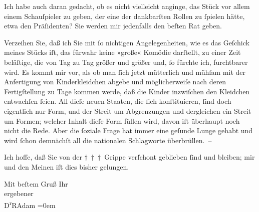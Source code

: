 \pstart
           Ich habe auch daran gedacht, ob es nicht vielleicht anginge, das {\pb}Stück vor allem einem Schauſpieler zu
               geben, der eine der dankbarſten Rollen zu{ }ſpielen hätte, etwa den Präſidenten? Sie werden mir jedenfalls den
               beſten Rat geben.\pend
           
\pstart
           Verzeihen Sie, daß ich Sie mit{ }ſo nichtigen Angelegenheiten, wie es das Geſchick
               meines Stücks iſt, das fürwahr
               keine »große« Komödie darſtellt, zu einer Zeit beläſtige, die von Tag zu Tag größer
               und größer und,{ }ſo fürchte ich, furchtbarer wird. Es kommt mir vor, als ob man{ }ſich
               jetzt mütterlich und mühſam mit der Anfertigung von Kinderkleidchen abgebe und
               möglicherweiſe nach deren Fertigſtellung zu Tage kommen werde, daß die Kinder
               inzwiſchen  den Kleidchen
               entwachſen{ }ſeien. All dieſe neuen Staaten, die{ }ſich konſtituieren,{ }ſind doch
               eigentlich nur Form, und der Streit um Abgrenzungen und dergleichen ein Streit um
               Formen; welcher Inhalt dieſe Form füllen wird, davon iſt überhaupt noch nicht die
               Rede. Aber {\pb}die{ }ſoziale Frage hat immer
               eine geſunde Lunge gehabt und wird{ }ſchon demnächſt all die nationalen Schlagworte
               überbrüllen. –\pend
           
\pstart
           Ich hoffe, daß Sie von der † † † Grippe verſchont geblieben{ }ſind und bleiben; mir und
               den Meinen iſt dies bisher gelungen.\pend
           
\pstart
           Mit beſtem Gruß Ihr{\\[\baselineskip]}ergebener{\\[\baselineskip]}\spacefill\mbox{D\textsuperscript{r}RAdam}\pend
           \leftskip=0em{}\endnumbering{}  \newcommand{\dateiname}{L02308}\newcommand{\titel}{Robert Adam an Arthur Schnitzler, 25. 10. 1918}\newcommand{\editorInnen}{Martin Anton Müller und Gerd-Hermann Susen}
